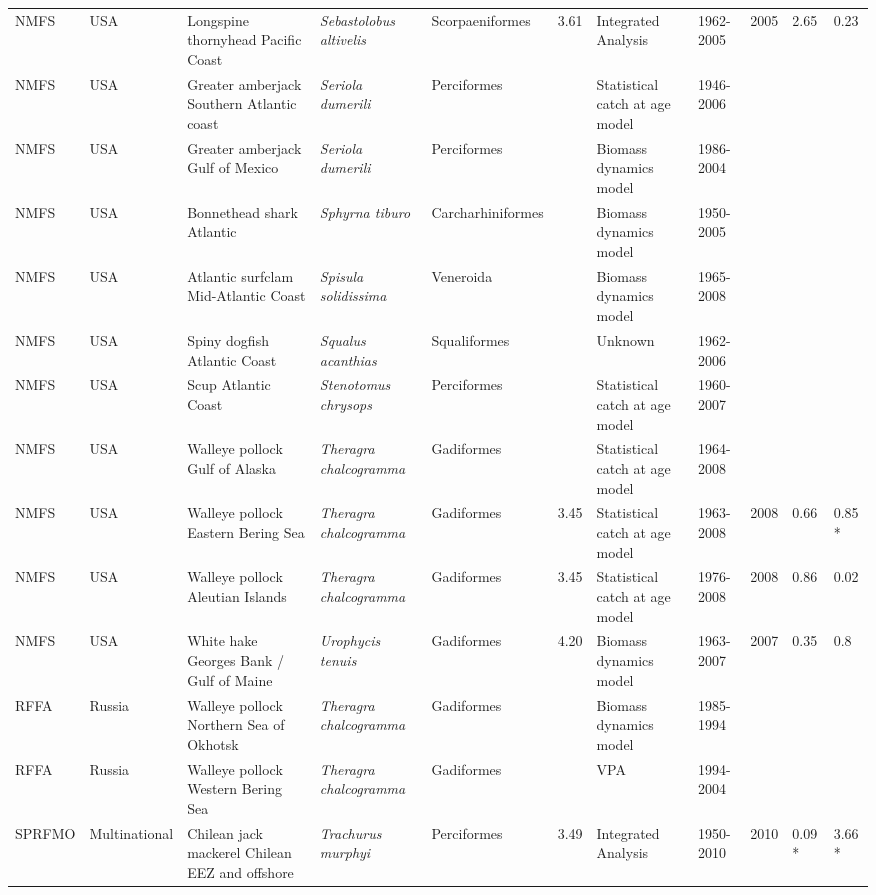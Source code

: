 \begin{longtable}{p{1.5cm}p{1.5cm}p{3cm}p{3cm}p{2.5cm}p{0.9cm}p{1.4cm}p{0.9cm}p{0.9cm}p{0.9cm}p{1cm}}
  NMFS & USA & Longspine thornyhead Pacific Coast & \textit{Sebastolobus altivelis} & Scorpaeniformes & 3.61 & Integrated Analysis & 1962-2005 & 2005 & 2.65 & 0.23 \\ 
  NMFS & USA & Greater amberjack Southern Atlantic coast & \textit{Seriola dumerili} & Perciformes &  & Statistical catch at age model & 1946-2006 &  &  &  \\ 
  NMFS & USA & Greater amberjack Gulf of Mexico & \textit{Seriola dumerili} & Perciformes &  & Biomass dynamics model & 1986-2004 &  &  &  \\ 
  NMFS & USA & Bonnethead shark Atlantic & \textit{Sphyrna tiburo} & Carcharhiniformes &  & Biomass dynamics model & 1950-2005 &  &  &  \\ 
  NMFS & USA & Atlantic surfclam Mid-Atlantic Coast & \textit{Spisula solidissima} & Veneroida &  & Biomass dynamics model & 1965-2008 &  &  &  \\ 
  NMFS & USA & Spiny dogfish Atlantic Coast & \textit{Squalus acanthias} & Squaliformes &  & Unknown & 1962-2006 &  &  &  \\ 
  NMFS & USA & Scup Atlantic Coast & \textit{Stenotomus chrysops} & Perciformes &  & Statistical catch at age model & 1960-2007 &  &  &  \\ 
  NMFS & USA & Walleye pollock Gulf of Alaska & \textit{Theragra chalcogramma} & Gadiformes &  & Statistical catch at age model & 1964-2008 &  &  &  \\ 
  NMFS & USA & Walleye pollock Eastern Bering Sea & \textit{Theragra chalcogramma} & Gadiformes & 3.45 & Statistical catch at age model & 1963-2008 & 2008 & 0.66 & 0.85 * \\ 
  NMFS & USA & Walleye pollock Aleutian Islands & \textit{Theragra chalcogramma} & Gadiformes & 3.45 & Statistical catch at age model & 1976-2008 & 2008 & 0.86 & 0.02 \\ 
  NMFS & USA & White hake Georges Bank / Gulf of Maine & \textit{Urophycis tenuis} & Gadiformes & 4.20 & Biomass dynamics model & 1963-2007 & 2007 & 0.35 & 0.8 \\ 
  RFFA & Russia & Walleye pollock Northern Sea of Okhotsk & \textit{Theragra chalcogramma} & Gadiformes &  & Biomass dynamics model & 1985-1994 &  &  &  \\ 
  RFFA & Russia & Walleye pollock Western Bering Sea & \textit{Theragra chalcogramma} & Gadiformes &  & VPA & 1994-2004 &  &  &  \\ 
  SPRFMO & Multinational & Chilean jack mackerel Chilean EEZ and offshore & \textit{Trachurus murphyi} & Perciformes & 3.49 & Integrated Analysis & 1950-2010 & 2010 & 0.09 * & 3.66 * \\ 

\end{longtable}
